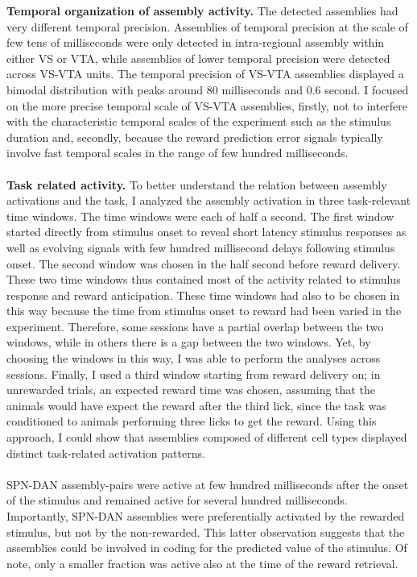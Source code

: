 \textbf{Temporal organization of assembly activity.} The detected assemblies had very different temporal precision. Assemblies of temporal precision at the scale of few tens of milliseconds were only detected in intra-regional assembly within either VS or VTA, while assemblies of lower temporal precision were detected across VS-VTA units. The temporal precision of VS-VTA assemblies displayed a bimodal distribution with peaks around $80$ milliseconds and $0.6$ second. I focused on the more precise temporal scale of VS-VTA assemblies, firstly, not to interfere with the characteristic temporal scales of the experiment such as the stimulus duration and, secondly, because the reward prediction error signals typically involve fast temporal scales in the range of few hundred milliseconds.\\\\
\textbf{Task related activity.} To better understand the relation between assembly activations and the task, I analyzed the assembly activation in three task-relevant time windows. The time windows were each of half a second. The first window started directly from stimulus onset to reveal short latency stimulus responses as well as evolving signals with few hundred millisecond delays following stimulus onset. The second window was chosen in the half second before reward delivery. These two time windows thus contained most of the activity related to stimulus response and reward anticipation. These time windows had also to be chosen in this way because the time from stimulus onset to reward had been varied in the experiment. Therefore, some sessions have a partial overlap between the two windows, while in others there is a gap between the two windows.  Yet, by choosing the windows in this way, I was able to perform the analyses across sessions. Finally, I used a third window starting from reward delivery on; in unrewarded trials, an expected reward time was chosen, assuming that the animals would have expect the reward after the third lick, since the task was conditioned to animals performing three licks to get the reward. Using this approach, I could show that assemblies composed of different cell types displayed distinct task-related activation patterns.\\\\
SPN-DAN assembly-pairs were active at few hundred milliseconds after the onset of the stimulus and remained active for several hundred milliseconds. Importantly, SPN-DAN assemblies were preferentially activated by the rewarded stimulus, but not by the non-rewarded. This latter observation suggests that the assemblies could be involved in coding for the predicted value of the stimulus. Of note, only a smaller fraction was active also at the time of the reward retrieval.\\\\
